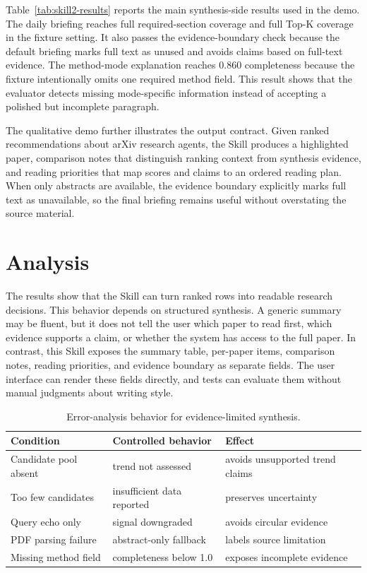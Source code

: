 \documentclass{article}
\begin{document}
Table~\ref{tab:skill2-results} reports the main synthesis-side results used in the demo. The daily briefing reaches full required-section coverage and full Top-K coverage in the fixture setting. It also passes the evidence-boundary check because the default briefing marks full text as unused and avoids claims based on full-text evidence. The method-mode explanation reaches 0.860 completeness because the fixture intentionally omits one required method field. This result shows that the evaluator detects missing mode-specific information instead of accepting a polished but incomplete paragraph.

The qualitative demo further illustrates the output contract. Given ranked recommendations about arXiv research agents, the Skill produces a highlighted paper, comparison notes that distinguish ranking context from synthesis evidence, and reading priorities that map scores and claims to an ordered reading plan. When only abstracts are available, the evidence boundary explicitly marks full text as unavailable, so the final briefing remains useful without overstating the source material.

\section{Analysis}

The results show that the Skill can turn ranked rows into readable research decisions. This behavior depends on structured synthesis. A generic summary may be fluent, but it does not tell the user which paper to read first, which evidence supports a claim, or whether the system has access to the full paper. In contrast, this Skill exposes the summary table, per-paper items, comparison notes, reading priorities, and evidence boundary as separate fields. The user interface can render these fields directly, and tests can evaluate them without manual judgments about writing style.

\begin{table}[t]
  \centering
  \caption{Error-analysis behavior for evidence-limited synthesis.}
  \label{tab:skill2-errors}
  \small
  \begin{tabular}{@{}lll@{}}
    \toprule
    Condition & Controlled behavior & Effect \\
    \midrule
    Candidate pool absent & trend not assessed & avoids unsupported trend claims \\
    Too few candidates & insufficient data reported & preserves uncertainty \\
    Query echo only & signal downgraded & avoids circular evidence \\
    PDF parsing failure & abstract-only fallback & labels source limitation \\
    Missing method field & completeness below 1.0 & exposes incomplete evidence \\
    \bottomrule
  \end{tabular}
\end{table}
\end{document}
